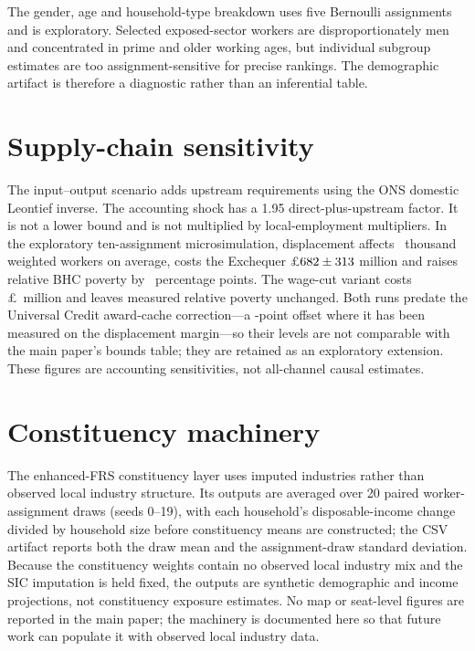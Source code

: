 The gender, age and household-type breakdown uses five Bernoulli assignments
and is exploratory. Selected exposed-sector workers are disproportionately men
and concentrated in prime and older working ages, but individual subgroup
estimates are too assignment-sensitive for precise rankings. The demographic
artifact is therefore a diagnostic rather than an inferential table.

\section{Supply-chain sensitivity}\label{supp:supplychain}

The input--output scenario adds upstream requirements using the ONS domestic Leontief inverse. The accounting shock has a 1.95 direct-plus-upstream factor. It is not a lower bound and is not multiplied by local-employment multipliers. In the exploratory ten-assignment microsimulation, displacement affects \SupplyChainDisplacedWorkers\ thousand weighted workers on average, costs the Exchequer \pounds $682\pm313$ million and raises relative BHC poverty by \SupplyChainDisplacedPoverty\ percentage points. The wage-cut variant costs \pounds\SupplyChainWageExchequer\ million and leaves measured relative poverty unchanged. Both runs predate the Universal Credit award-cache correction---a \FactorialCacheShift-point offset where it has been measured on the displacement margin---so their levels are not comparable with the main paper's bounds table; they are retained as an exploratory extension. These figures are accounting sensitivities, not all-channel causal estimates.

\section{Constituency machinery}\label{supp:constituency}

The enhanced-FRS constituency layer uses imputed industries rather than observed local industry structure. Its outputs are averaged over 20 paired worker-assignment draws (seeds 0--19), with each household's disposable-income change divided by household size before constituency means are constructed; the CSV artifact reports both the draw mean and the assignment-draw standard deviation. Because the constituency weights contain no observed local industry mix and the SIC imputation is held fixed, the outputs are synthetic demographic and income projections, not constituency exposure estimates. No map or seat-level figures are reported in the main paper; the machinery is documented here so that future work can populate it with observed local industry data.

